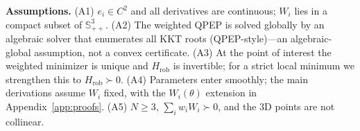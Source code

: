 \noindent\textbf{Assumptions.} (A1) $e_i\in C^2$ and all derivatives are continuous; $W_i$ lies in a
compact subset of $\mathbb{S}^3_{++}$. (A2) The weighted QPEP is solved globally by an algebraic
solver that enumerates all KKT roots (QPEP-style)---an algebraic-global assumption, not a convex
certificate. (A3) At the point of interest the weighted minimizer is unique and $H_{\mathrm{rob}}$ is
invertible; for a strict local minimum we strengthen this to $H_{\mathrm{rob}}\succ0$. (A4)
Parameters enter smoothly; the main derivations assume $W_i$ fixed, with the $W_i(\theta)$ extension
in Appendix~\ref{app:proofs}. (A5) $N\ge3$, $\sum_iw_iW_i\succ0$, and the 3D points are not
collinear.
